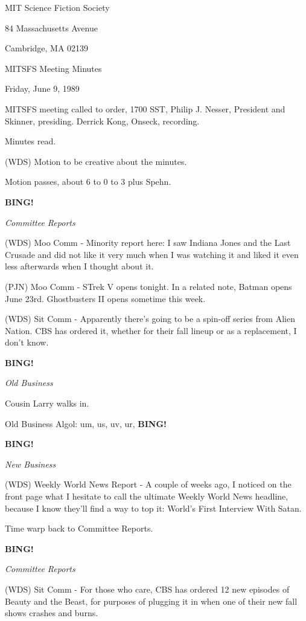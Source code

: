 \documentclass[12pt]{article}
\newcommand{\bing}{{\bf BING!} }
\newcommand{\goto}[1]{\bing \vskip 12pt \centerline{{\em{#1}}}}
\begin{document}
\begin{center}

MIT Science Fiction Society 

84 Massachusetts Avenue

Cambridge, MA 02139

\vspace{12pt}

MITSFS Meeting Minutes 

Friday, June 9, 1989

\end{center}
 
\vspace{18pt}

\setlength{\parskip}{6pt}

\noindent
MITSFS meeting called to order, 1700 SST, Philip J. Nesser, President and Skinner, presiding. Derrick Kong, Onseck, recording.

Minutes read.

(WDS) Motion to be creative about the minutes.

Motion passes, about 6 to 0 to 3 plus Spehn.

\goto{Committee Reports}

(WDS) Moo Comm - Minority report here: I saw Indiana Jones and the Last Crusade and did not like it very much when I was watching it and liked it even less afterwards when I thought about it.

(PJN) Moo Comm - STrek V opens tonight. In a related note, Batman opens June 23rd. Ghostbusters II opens sometime this week.

(WDS) Sit Comm - Apparently there's going to be a spin-off series from Alien Nation. CBS has ordered it, whether for their fall lineup or as a replacement, I don't know.

\goto{Old Business}

Cousin Larry walks in.

Old Business Algol: um, us, uv, ur, \bing

\goto{New Business}

(WDS) Weekly World News Report - A couple of weeks ago, I noticed on the front page what I hesitate to call the ultimate Weekly World News headline, because I know they'll find a way to top it: World's First Interview With Satan.

Time warp back to Committee Reports.

\goto{Committee Reports}

(WDS) Sit Comm - For those who care, CBS has ordered 12 new episodes of Beauty and the Beast, for purposes of plugging it in when one of their new fall shows crashes and burns.
\end{document}
